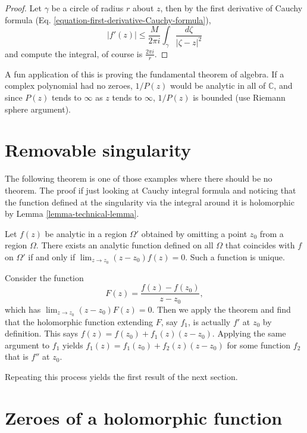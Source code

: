 \begin{proof}
Let $\gamma$ be a circle of radius $r$ about $z$, then by the first derivative
of Cauchy formula (Eq. \ref{equation-first-derivative-Cauchy-formula}),
$$
|f'(z)|\leq \frac{M}{2\pi i}\int_\gamma \frac{d\zeta}{|\zeta-z|^2}
$$
and compute the integral, of course is $\frac{2\pi i}{r}$.
\end{proof}

A fun application of this is proving the fundamental theorem of algebra. If a
complex polynomial had no zeroes, $1/P(z)$ would be analytic in all of
$\mathbb{C}$, and since $P(z)$ tends to $\infty$ as $z$ tends to $\infty$,
$1/P(z)$ is bounded (use Riemann sphere argument).

\section{Removable singularity}
\label{section-removable-singularity}

The following theorem is one of those examples where there should be no theorem.
The proof if just looking at Cauchy integral formula and noticing that the
function defined at the singularity via the integral around it is holomorphic by
Lemma \ref{lemma-technical-lemma}.

\begin{theorem}
\label{theorem-removable-singularity}
Let $f(z)$ be analytic in a region $\Omega'$ obtained by omitting a point $z_0$
from a region $\Omega$. There exists an analytic function  defined on all 
$\Omega$ that coincides with $f$ on $\Omega'$ if and only if 
$\lim_{z \to z_0} (z-z_0)f(z)=0$. Such a function is unique.
\end{theorem}

Consider the function
$$
F(z)=\frac{f(z)-f(z_0)}{z-z_0},
$$
which has $\lim_{z\to z_0} (z-z_0)F(z)=0$. Then we apply the theorem and find
that the holomorphic function extending $F$, say $f_1$, is actually $f'$ at
$z_0$ by definition. This says $f(z)=f(z_0)+f_1(z)(z-z_0)$. Applying the same
argument to $f_1$ yields $f_1(z)=f_1(z_0)+f_2(z)(z-z_0)$ for some function
$f_2$ that is $f''$ at $z_0$.

Repeating this process yields the first result of the 
next section.

\section{Zeroes of a holomorphic function}
\label{section-zeroes}

